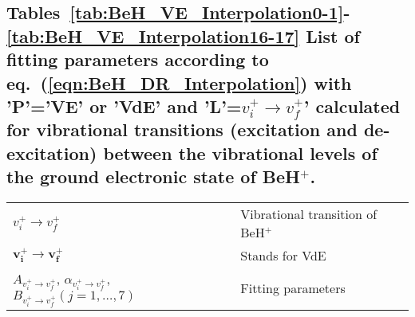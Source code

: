 \documentclass[reviewcopy]{elsarticle}
\begin{document}
\subsection*{Tables~\ref{tab:BeH_VE_Interpolation0-1}-\ref{tab:BeH_VE_Interpolation16-17} List of fitting parameters according to eq.~(\ref{eqn:BeH_DR_Interpolation}) with 'P'='VE' or 'VdE' and 'L'=$v_i^+\to v_f^+$' calculated for vibrational transitions (excitation and de-excitation) between the vibrational levels of the ground electronic state of BeH$^+$.}
\begin{tabular}{@{}p{2.5in}p{6in}@{}}
$v_i^+\to v_f^+$		& Vibrational transition of BeH$^+$ \\
 $\boldsymbol{v_i^+}$$\to$$\boldsymbol{ v_f^+}$	& Stands for VdE\\
$A_{v^+_i\to v^+_f}$, $\alpha_{v^+_i\to v^+_f}$, $B_{v^+_i\to v^+_f}(j=1,\dots,7)$	& Fitting parameters \\
\end{tabular}

\clearpage
\datatables
\end{document}
